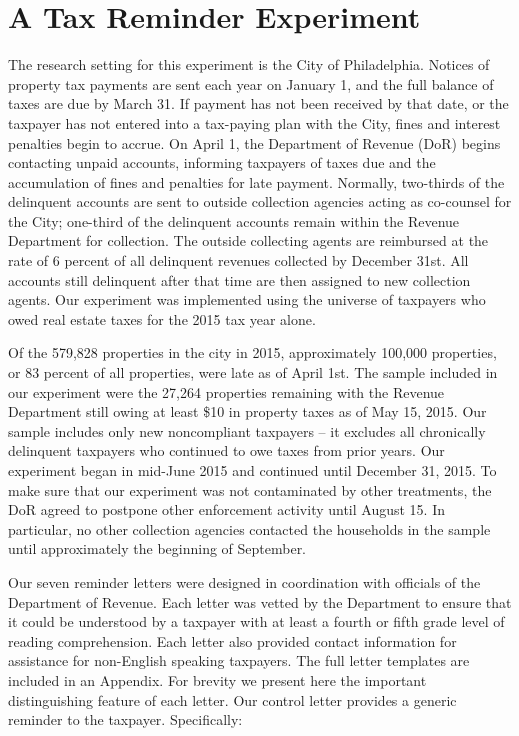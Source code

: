 \documentclass[12pt]{article}
\begin{document}
  
\section{ A Tax Reminder Experiment}
 

The research setting for this experiment is the City of Philadelphia.
Notices of property tax payments are sent each year on January 1, and
the full balance of taxes are due by March 31.  If payment has not
been received by that date, or the taxpayer has not entered into a
tax-paying plan with the City, fines and interest penalties begin to
accrue.  On April 1, the Department of Revenue (DoR) begins contacting
unpaid accounts, informing taxpayers of taxes due and the accumulation
of fines and penalties for late payment.  Normally, two-thirds of the
delinquent accounts are sent to outside collection agencies acting as
co-counsel for the City; one-third of the delinquent accounts remain
within the Revenue Department for collection.  The outside collecting
agents are reimbursed at the rate of 6 percent of all delinquent
revenues collected by December 31st.  All accounts still delinquent
after that time are then assigned to new collection agents.  Our
experiment was implemented using the universe of taxpayers who owed real
estate taxes for the 2015 tax year alone.
  
Of the 579,828 properties in the city in 2015, approximately 100,000
properties, or 83 percent of all properties, were late as of April
1st.  The sample included in our experiment were the 27,264 properties
remaining with the Revenue Department still owing at least \$10 in
property taxes as of May 15, 2015.  Our sample includes only new
noncompliant taxpayers -- it excludes all chronically delinquent
taxpayers who continued to owe taxes from prior years.  Our experiment
began in mid-June 2015 and continued until December 31, 2015.  To make
sure that our experiment was not contaminated by other treatments, the
DoR agreed to postpone other enforcement activity until August 15. In
particular, no other collection agencies contacted the households in
the sample until approximately the beginning of September.

Our seven reminder letters were designed in coordination with
officials of the Department of Revenue.  Each letter was vetted by the
Department to ensure that it could be understood by a taxpayer with at
least a fourth or fifth grade level of reading comprehension.  Each
letter also provided contact information for assistance for
non-English speaking taxpayers.  The full letter templates are
included in an Appendix.  For brevity we present here the important
distinguishing feature of each letter.  Our control letter provides a
generic reminder to the taxpayer. Specifically:
 
\end{document}
